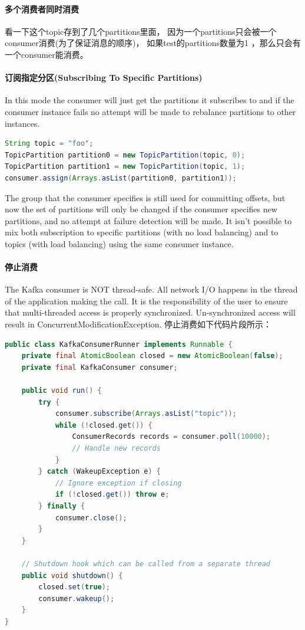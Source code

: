 \documentclass{book}
\begin{document}
\paragraph{多个消费者同时消费}

看一下这个topic存到了几个partitions里面，
因为一个partitions只会被一个consumer消费(为了保证消息的顺序)，
如果test的partitions数量为1 ，那么只会有一个consumer能消费。

\paragraph{订阅指定分区(Subscribing To Specific Partitions)}

In this mode the consumer will just get the partitions it subscribes 
to and if the consumer instance fails no attempt will be made to 
rebalance partitions to other instances.

\begin{lstlisting}[language=Java]
String topic = "foo";
TopicPartition partition0 = new TopicPartition(topic, 0);
TopicPartition partition1 = new TopicPartition(topic, 1);
consumer.assign(Arrays.asList(partition0, partition1));
\end{lstlisting}

The group that the consumer specifies is still used for committing offsets, 
but now the set of partitions will only be changed if the consumer 
specifies new partitions, and no attempt at failure detection will be made.
It isn't possible to mix both subscription to specific partitions 
(with no load balancing) and to topics (with load balancing) 
using the same consumer instance.

\paragraph{停止消费}

The Kafka consumer is NOT thread-safe. 
All network I/O happens in the thread of the application making the call. 
It is the responsibility of the user to ensure that multi-threaded access is properly synchronized. 
Un-synchronized access will result in ConcurrentModificationException.
停止消费如下代码片段所示：

\begin{lstlisting}[language=Java]
public class KafkaConsumerRunner implements Runnable {
	private final AtomicBoolean closed = new AtomicBoolean(false);
	private final KafkaConsumer consumer;
	
	public void run() {
		try {
			consumer.subscribe(Arrays.asList("topic"));
			while (!closed.get()) {
				ConsumerRecords records = consumer.poll(10000);
				// Handle new records
			}
		} catch (WakeupException e) {
			// Ignore exception if closing
			if (!closed.get()) throw e;
		} finally {
			consumer.close();
		}
	}
		
	// Shutdown hook which can be called from a separate thread
	public void shutdown() {
		closed.set(true);
		consumer.wakeup();
	}
}
\end{lstlisting}
\end{document}
